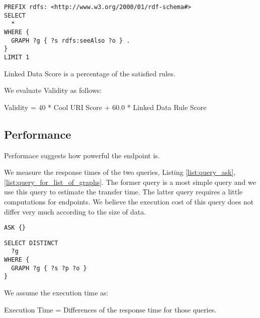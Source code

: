 \documentclass[11pt,a4paper]{article}
\begin{document}
\begin{itemize}
\begin{enumerate}
      \begin{lstlisting}[basicstyle=\ttfamily\footnotesize,breaklines=true,frame=single,caption=A Query for a See Also Statement,label=list:query_for_see_also]
PREFIX rdfs: <http://www.w3.org/2000/01/rdf-schema#>
SELECT
  *
WHERE {
  GRAPH ?g { ?s rdfs:seeAlso ?o } .
}
LIMIT 1
      \end{lstlisting}

    \end{enumerate}

    Linked Data Score is a percentage of the satisfied rules.

  \end{itemize}

  We evaluate Validity as follows:

  \begin{mdframed}
    \center
Validity = 40 * Cool URI Score + 60.0 * Linked Data Rule Score
  \end{mdframed}

\subsection{Performance}

  Performace suggests how powerful the endpoint is.

  We measure the response times of the two queries, Listing \ref{list:query_ask}, \ref{list:query_for_list_of_graphs}. The former query is a most simple query and we use this query to estimate the transfer time. The latter query requires a little computations for endpoints. We believe the execution cost of this query does not differ very much according to the size of data.

  \begin{lstlisting}[basicstyle=\ttfamily\footnotesize,breaklines=true,frame=single,caption=A Most Simple Query,label=list:query_ask]
ASK {}
  \end{lstlisting}

  \begin{lstlisting}[basicstyle=\ttfamily\footnotesize,breaklines=true,frame=single,caption=A Query for Listing Graphs,label=list:query_for_list_of_graphs]
SELECT DISTINCT
  ?g
WHERE {
  GRAPH ?g { ?s ?p ?o }
}
  \end{lstlisting}

  We assume the execution time as:

  \begin{mdframed}
    \center
Execution Time = Differences of the response time for those queries.
  \end{mdframed}
\end{document}
